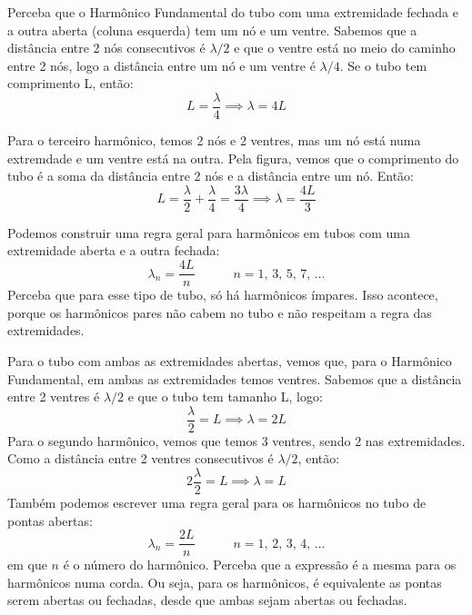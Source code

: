 \documentclass[12pt]{extarticle}
\newcommand{\<}{\langle}
\renewcommand{\>}{\rangle}
\theoremstyle{definition}
\begin{document}
Perceba que o Harmônico Fundamental do tubo com uma extremidade fechada e a outra aberta (coluna esquerda) tem um nó e um ventre. Sabemos que a distância entre 2 nós consecutivos é $\lambda/2$ e que o ventre está no meio do caminho entre 2 nós, logo a distância entre um nó e um ventre é $\lambda/4$. Se o tubo tem comprimento L, então:
\begin{equation}
    L= \frac{\lambda}{4} \implies \lambda = 4L
\end{equation}

Para o terceiro harmônico, temos 2 nós e 2 ventres, mas um nó está numa extremdade e um ventre está na outra. Pela figura, vemos que o comprimento do tubo é a soma da distância entre 2 nós e a distância entre um nó. Então:
\begin{equation}
    L = \frac{\lambda}{2}+\frac{\lambda}{4} = \frac{3\lambda}{4} \implies \lambda = \frac{4L}{3}
\end{equation}

Podemos construir uma regra geral para harmônicos em tubos com uma extremidade aberta e a outra fechada:
\begin{equation}
    \lambda_n = \frac{4L}{n}\quad\quad\quad n=1,\,3,\,5,\,7,\,\dots
\end{equation}
Perceba que para esse tipo de tubo, só há harmônicos ímpares. Isso acontece, porque os harmônicos pares não cabem no tubo e não respeitam a regra das extremidades.

Para o tubo com ambas as extremidades abertas, vemos que, para o Harmônico Fundamental, em ambas as extremidades temos ventres. Sabemos que a distância entre 2 ventres é $\lambda/2$ e que o tubo tem tamanho L, logo:
\begin{equation}
    \frac{\lambda}{2}=L \implies\lambda = 2L
\end{equation}
Para o segundo harmônico, vemos que temos 3 ventres, sendo 2 nas extremidades. Como a distância entre 2 ventres consecutivos é $\lambda/2$, então:
\begin{equation}
    2\frac{\lambda}{2}=L \implies \lambda=L
\end{equation}
Também podemos escrever uma regra geral para os harmônicos no tubo de pontas abertas:
\begin{equation}
    \lambda_n = \frac{2L}{n} \quad\quad\quad n=1,\,2,\,3,\,4,\,\dots
\end{equation}
\noindent em que $n$ é o número do harmônico. Perceba que a expressão é a mesma para os harmônicos numa corda. Ou seja, para os harmônicos, é equivalente as pontas serem abertas ou fechadas, desde que ambas sejam abertas ou fechadas.
\end{document}
